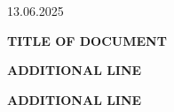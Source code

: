 \begin{titlepage}


\vspace*{8cm}

\hspace*{2cm}
13.06.2025

\hspace*{2cm}
{\Huge \textbf{\textcolor{swisstphblue}{TITLE OF DOCUMENT}} \par} %

\vspace{1cm}

\hspace*{2cm}
{\Huge \textbf{\textcolor{swisstphblue}{ADDITIONAL LINE}} \par} %

\hspace*{2cm}
{\Huge \textbf{\textcolor{swisstphblue}{ADDITIONAL LINE}} \par} %


\end{titlepage}
